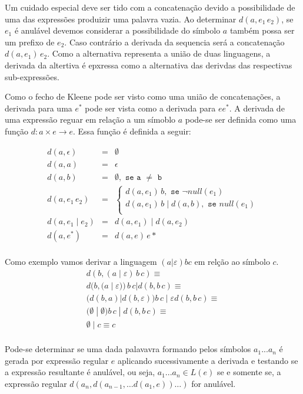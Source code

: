Um cuidado especial deve ser tido com a concatenação devido a possibilidade de uma das expressões produizir uma palavra vazia. Ao determinar
$d(a,e_1\,e_2)$, se $e_1$ é anulável devemos considerar a possibilidade do símbolo $a$ também possa ser um prefixo de $e_2$. Caso contrário
a derivada da sequencia será a concatenação  $d(a,e_1)\,e_2$. Como a alternativa representa a união de duas linguagens, a derivada da
altertiva é epxressa como a alternativa das derivdas das respectivas sub-expressões.

Como o fecho de Kleene pode ser visto como uma união de concatenações, a derivada para uma $e^*$ pode ser vista como a derivada para $ee^*$.
A derivada de uma expressão reguar em relação a um símoblo $a$ pode-se ser definida como uma função $d : a\times e \to e$. Essa função
é definida a seguir:

\[
\begin{array}{lcl}
d(a,\epsilon) & = & \emptyset\\
d(a,a) & = & \epsilon\\
d(a,b) & = & \emptyset, \texttt{ se a } \not = \texttt{ b} \\
d(a,e_1 \,e_2) & = & \left\{\begin{array}{l}
                               d(a,e_1)\,b, \texttt{ se } \neg null(e_1)\\
                               d(a,e_1)\,b \;|\; d(a,b), \texttt{ se } null(e_1)\\
                          \end{array}\right.\\
d(a,e_1\;|\; e_2) & = & d(a,e_1) \;|\; d(a,e_2) \\
d(a,e^*) & = & d(a,e)\,e* \\
\end{array}
\]

Como exemplo vamos derivar a linguagem $(a|\varepsilon)bc$ em relção ao símbolo $c$.
\[
\begin{array}{l}
d(b,(a\;|\;\varepsilon)\,b\,c) \equiv \\
d(b,(a\;|\;\varepsilon))\,b\,c | d(b,b\,c) \equiv\\
(d(b,a)|d(b,\varepsilon))b\,c \;|\; \varepsilon d(b,b\,c) \equiv\\
(\emptyset \;|\; \emptyset)b\,c \;|\; d(b,b\,c) \equiv\\
\emptyset \;|\; c \equiv c\\
\end{array}
\]

Pode-se determinar se uma dada palavavra formando pelos símbolos $a_1...a_n$ é gerada por expressão regular $e$ aplicando sucessivamente
a derivada e testando se a expressão resultante é anulável, ou seja, $a_1...a_n \in L(e)$ se e somente se, a expressão regular $d(a_n, d(a_{n-1}, \ldots d(a_1,e))\ldots )$ for anulável.


